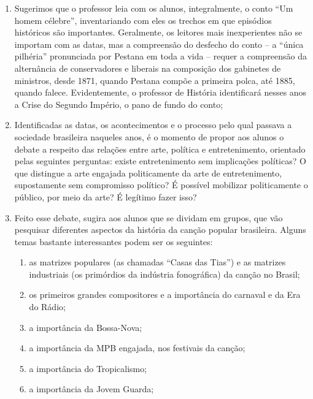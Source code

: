 \documentclass[11pt]{extarticle}
\begin{document}
\begin{enumerate}
\item Sugerimos que o professor leia com os alunos, integralmente, o conto
``Um homem célebre'', inventariando com eles os trechos em que episódios
históricos são importantes. Geralmente, os leitores mais inexperientes
não se importam com as datas, mas a compreensão do desfecho do conto --
a ``única pilhéria'' pronunciada por Pestana em toda a vida -- requer a
compreensão da alternância de conservadores e liberais na composição dos
gabinetes de ministros, desde 1871, quando Pestana compõe a primeira
polca, até 1885, quando falece. Evidentemente, o professor de História
identificará nesses anos a Crise do Segundo Império, o pano de fundo do
conto;

\item Identificadas as datas, os acontecimentos e o processo pelo qual
passava a sociedade brasileira naqueles anos, é o momento de propor aos
alunos o debate a respeito das relações entre arte, política e
entretenimento, orientado pelas seguintes perguntas: existe
entretenimento sem implicações políticas? O que distingue a arte
engajada politicamente da arte de entretenimento, supostamente sem
compromisso político? É possível mobilizar politicamente o público, por
meio da arte? É legítimo fazer isso?

\item Feito esse debate, sugira aos alunos que se dividam em grupos, que
vão pesquisar diferentes aspectos da história da canção popular
brasileira. Alguns temas bastante interessantes podem ser os seguintes:

\begin{enumerate}
\item as matrizes populares (as chamadas ``Casas das Tias'') e as matrizes
industriais (os primórdios da indústria fonográfica) da canção no
Brasil;

\item os primeiros grandes compositores e a importância do carnaval e da
Era do Rádio;

\item a importância da Bossa-Nova;

\item a importância da MPB engajada, nos festivais da canção;

\item a importância do Tropicalismo;

\item a importância da Jovem Guarda;


\end{enumerate}
\end{enumerate}
\end{document}
